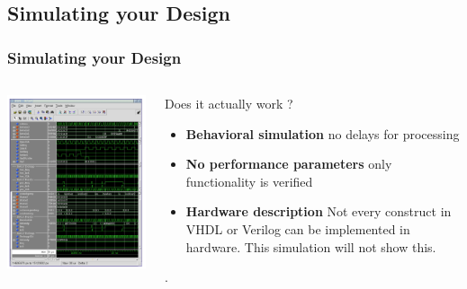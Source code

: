 \documentclass[compress]{beamer}
\begin{document}
\subsection[Sim]{Simulating your Design}
\begin{frame}
	\frametitle{Simulating your Design}
	\begin{columns}
		\begin{center}
			\includegraphics[width=\textwidth]{test}
		\end{center}
		
		\begin{block}{Does it actually work ?}
			\begin{itemize}
				\item \textbf {Behavioral simulation} \newline
				no delays for processing
				\item \textbf {No performance parameters} \newline
				only functionality is verified
				\item \textbf {Hardware description} \newline
				Not every construct in VHDL or Verilog can be implemented in hardware. This simulation will not show this.
			\end{itemize}.
		\end{block}
	\end{columns}
\end{frame}
\end{document}
